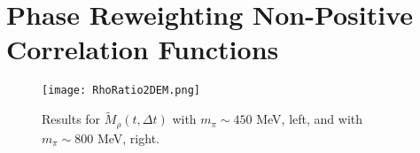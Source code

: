 %
%
%


\section{Phase Reweighting Non-Positive Correlation Functions}


\begin{figure}[!t]
  \centering
  \texttt{[image: RhoRatio2DEM.png]} 
  \caption{Results for $\tilde{M}_\rho(t,\Delta t)$ with $m_\pi\sim 450$ MeV, left, and with $m_\pi \sim 800$ MeV, right.}
  \label{Rho2DWEM}
\end{figure}

